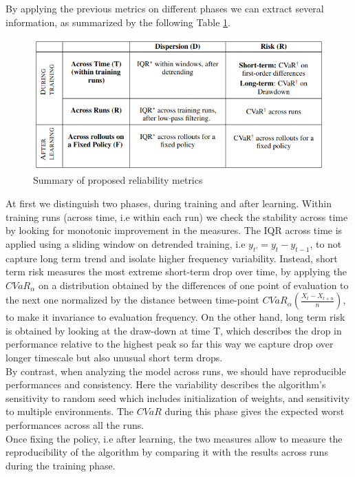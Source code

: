 \documentclass{article}
\begin{document}
By applying the previous metrics on different phases we can extract several information, as summarized by the following Table \ref{fig:table}.
\begin{figure}[!htp]
	\centering
	\includegraphics[scale=0.3]{./images/table.png}
	\caption{Summary of proposed reliability metrics~\cite{GoogleMeasure}}
	\label{fig:table}
	\footnotesize{}
\end{figure}
At first we distinguish two phases, during training and after learning.
Within training runs (across time, i.e within each run) we check the stability across time by looking for monotonic improvement in the measures.
The IQR across time is applied using a sliding window on detrended training, i.e $y_{t'} = y_{t} - y_{t-1}$, to not capture long term trend and isolate higher frequency variability.
Instead, short term risk measures the most extreme short-term drop over time, by applying the $CVaR_\alpha$ on a distribution obtained by the differences of one point of evaluation to the next one normalized by the distance between time-point $CVaR_\alpha \left(\frac{X_t - X_{t+n}}{n}\right)$, to make it invariance to evaluation frequency. On the other hand, long term risk is obtained by looking at the draw-down at time T, which describes the drop in performance relative to the highest peak so far this way we capture drop over longer timescale but also unusual short term drops.\\
By contrast, when analyzing the model across runs, we should have reproducible performances and consistency. Here the variability describes the algorithm’s sensitivity to random seed which includes initialization of weights, and sensitivity to multiple environments. The $CVaR$ during this phase gives the expected worst performances across all the runs.\\
Once fixing the policy, i.e after learning, the two measures allow to measure the reproducibility of the algorithm by comparing it with the results across runs during the training phase.
\end{document}
